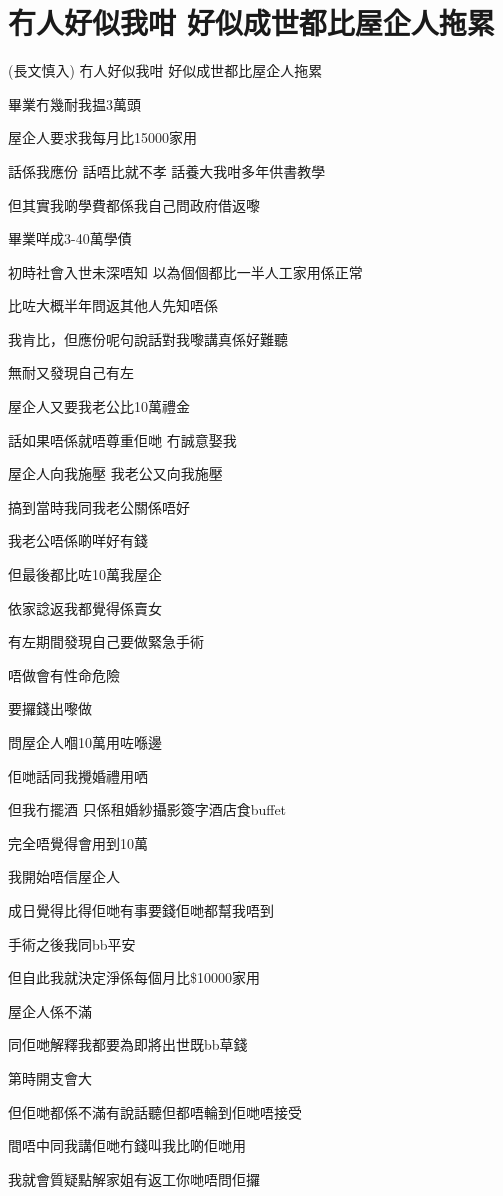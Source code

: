 \chapter{冇人好似我咁 好似成世都比屋企人拖累}

(長文慎入) 冇人好似我咁 好似成世都比屋企人拖累

畢業冇幾耐我揾3萬頭

屋企人要求我每月比15000家用

話係我應份 話唔比就不孝 話養大我咁多年供書教學

但其實我啲學費都係我自己問政府借返嚟

畢業咩成3-40萬學債

初時社會入世未深唔知 以為個個都比一半人工家用係正常

比咗大概半年問返其他人先知唔係

我肯比，但應份呢句說話對我嚟講真係好難聽

無耐又發現自己有左

屋企人又要我老公比10萬禮金

話如果唔係就唔尊重佢哋 冇誠意娶我

屋企人向我施壓 我老公又向我施壓

搞到當時我同我老公關係唔好

我老公唔係啲咩好有錢

但最後都比咗10萬我屋企

依家諗返我都覺得係賣女

有左期間發現自己要做緊急手術

唔做會有性命危險

要攞錢出嚟做

問屋企人嗰10萬用咗喺邊

佢哋話同我攪婚禮用哂

但我冇擺酒 只係租婚紗攝影簽字酒店食buffet

完全唔覺得會用到10萬

我開始唔信屋企人

成日覺得比得佢哋有事要錢佢哋都幫我唔到

手術之後我同bb平安

但自此我就決定淨係每個月比\$10000家用

屋企人係不滿

同佢哋解釋我都要為即將出世既bb草錢

第時開支會大

但佢哋都係不滿有說話聽但都唔輪到佢哋唔接受

間唔中同我講佢哋冇錢叫我比啲佢哋用

我就會質疑點解家姐有返工你哋唔問佢攞

